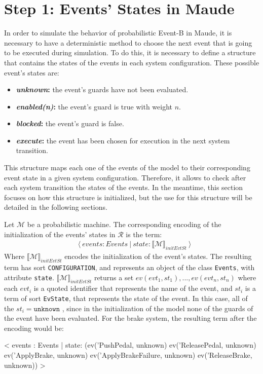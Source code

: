 \section{Step 1: Events' States in Maude}
In order to simulate the behavior of probabilistic Event-B in Maude, it is necessary to have a deterministic method to choose the next event that is going to be executed during simulation. To do this, it is necessary to define a structure that contains the states of the events in each system configuration. These possible event's states are:
\begin{itemize}
    \item \textbf{\textit{unknown}:} the event's guards have not been evaluated.
    \item \textbf{\textit{enabled(n)}:} the event's guard is true with weight $n$.
    \item \textbf{\textit{blocked}:} the event's guard is false.
    \item \textbf{\textit{execute}:} the event has been chosen for execution in the next system transition.
\end{itemize}
This structure maps each one of the events of the model to their corresponding event state in a given system configuration. Therefore, it allows to check after each system transition the states of the events. In the meantime, this section focuses on how this structure is initialized, but the use for this structure will be detailed in the following sections.

Let $\mathscr{M}$ be a probabilistic machine. The corresponding encoding of the initialization of the events' states in $\mathscr{R}$ is the term:
    \begin{align*}
    & \langle \ events : Events \ | \ state :  \llbracket \mathscr{M} \rrbracket_{initEvtSt}  \ \rangle
    \end{align*}
Where $\llbracket \mathscr{M} \rrbracket_{initEvtSt}$ encodes the initialization of the event's states. The resulting term has sort \texttt{CONFIGURATION}, and represents an object of the class \texttt{Events}, with attribute \texttt{state}. $\llbracket \mathscr{M} \rrbracket_{initEvtSt}$ returns a set $ev(evt_1,st_1), ..., ev(evt_n,st_n)$ where each $evt_i$ is a quoted identifier that represents the name of the event, and $st_i$ is a term of sort \texttt{EvState}, that represents the state of the event. In this case, all of the $st_i = \texttt{unknown}$ , since in the initialization of the model none of the guards of the event have been evaluated. For the brake system, the resulting term after the encoding would be:
\begin{maude}

< events : Events | state: (ev('PushPedal, unknown) 
                            ev('ReleasePedal, unknown) 
                            ev('ApplyBrake, unknown) 
                            ev('ApplyBrakeFailure, unknown) 
                            ev('ReleaseBrake, unknown)) >
\end{maude}

